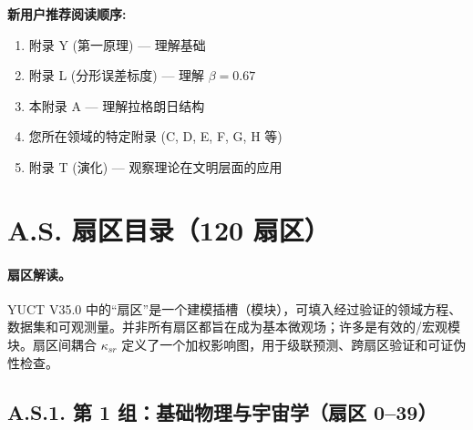 \documentclass[11pt,a4paper]{article}
\begin{document}
	\vspace{0.5cm}
	\noindent\textbf{新用户推荐阅读顺序:}
	\begin{enumerate}
		\item 附录 Y (第一原理) — 理解基础
		\item 附录 L (分形误差标度) — 理解 $\beta = 0.67$
		\item 本附录 A — 理解拉格朗日结构
		\item 您所在领域的特定附录 (C, D, E, F, G, H 等)
		\item 附录 T (演化) — 观察理论在文明层面的应用
	\end{enumerate}
	
	\tableofcontents
	\newpage
	
	\section*{A.S. 扇区目录（120 扇区）}
	\label{sec:sector-catalog}
	\paragraph{扇区解读。}
	YUCT V35.0 中的“扇区”是一个建模插槽（模块），可填入经过验证的领域方程、数据集和可观测量。并非所有扇区都旨在成为基本微观场；许多是有效的/宏观模块。扇区间耦合 $\kappa_{sr}$ 定义了一个加权影响图，用于级联预测、跨扇区验证和可证伪性检查。
	
	\subsection*{A.S.1. 第 1 组：基础物理与宇宙学（扇区 0--39）}
	
\end{document}
